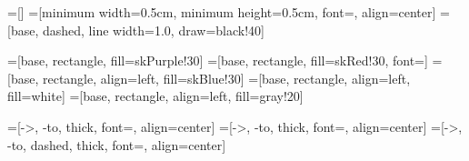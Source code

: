 
\def\itsquare{\setbox0=\hbox{$\blacksquare$}%
   \pdfliteral{q 1 0 .2 1 0 0 cm}\rlap{$\blacksquare$}\pdfliteral{Q}\kern 8pt }
\def\itsquareWhite{\setbox0=\hbox{$\blacksquare$}%
   \pdfliteral{q 1 0 .2 1 0 0 cm}\rlap{$\square$}\pdfliteral{Q}\kern 8pt }

\newcommand{\leg}[1]{\textcolor{#1}{\itsquare}}
\newcommand{\legWhite}[1]{\textcolor{#1}{\itsquareWhite}}
\newcommand{\clientLeg}{\leg{skPurple!30}}
\newcommand{\presidentLeg}{\leg{skRed!30}}
\newcommand{\amdsLeg}{\leg{skBlue!30}}
\newcommand{\cmdsLeg}{\legWhite{gray!80}}
\newcommand{\umdsLeg}{\leg{gray!20}}

=[]
=[minimum width=0.5cm, minimum height=0.5cm, font=\footnotesize, align=center]
=[base, dashed, line width=1.0, draw=black!40]

=[base, rectangle, fill=skPurple!30]
=[base, rectangle, fill=skRed!30, font=\normalsize]
=[base, rectangle, align=left, fill=skBlue!30]
=[base, rectangle, align=left, fill=white]
=[base, rectangle, align=left, fill=gray!20]

=[->, -to, thick, font=\normalsize, align=center]
=[->, -to, thick, font=\footnotesize, align=center]
=[->, -to, dashed, thick, font=\footnotesize, align=center]
